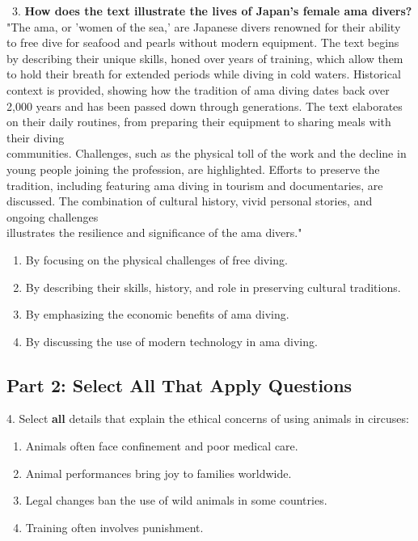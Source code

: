\documentclass[12pt]{article}
\begin{document}
\vspace{1cm}
\
3. \textbf{How does the text illustrate the lives of Japan’s female ama divers?\\}
"The ama, or 'women of the sea,' are Japanese divers renowned for their ability to free dive for seafood and pearls without modern equipment. The text begins by describing their unique skills, honed over years of training, which allow them to hold their breath for extended periods while diving in cold waters. Historical context is provided, showing how the tradition of ama diving dates back over 2,000 years and has been passed down through generations. The text elaborates on their daily routines, from preparing their equipment to sharing meals with their diving \\communities. Challenges, such as the physical toll of the work and the decline in young people joining the profession, are highlighted. Efforts to preserve the tradition, including featuring ama diving in tourism and documentaries, are discussed. The combination of cultural history, vivid personal stories, and ongoing challenges \\illustrates the resilience and significance of the ama divers."  
\begin{enumerate}[label=\Alph*.]
    \item By focusing on the physical challenges of free diving.  
    \item By describing their skills, history, and role in preserving cultural traditions.  
    \item By emphasizing the economic benefits of ama diving.  
    \item By discussing the use of modern technology in ama diving.  
\end{enumerate}

\vspace{1cm}

\subsection*{Part 2: Select All That Apply Questions}

4. Select \textbf{all} details that explain the ethical concerns of using animals in circuses:  
\begin{enumerate}[label=\Alph*.]
    \item Animals often face confinement and poor medical care.  
    \item Animal performances bring joy to families worldwide.  
    \item Legal changes ban the use of wild animals in some countries.  
    \item Training often involves punishment.  
\end{enumerate}
\end{document}
